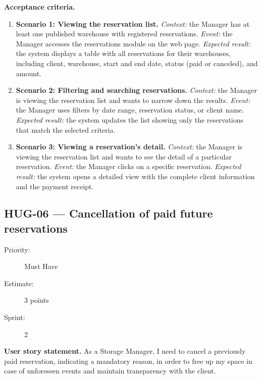 \documentclass[11pt,a4paper,oneside]{report}
\begin{document}
\textbf{Acceptance criteria.}
\begin{enumerate}
\item \textbf{Scenario 1: Viewing the reservation list.} \emph{Context:} the Manager has at least one published warehouse with registered reservations. \emph{Event:} the Manager accesses the reservations module on the web page. \emph{Expected result:} the system displays a table with all reservations for their warehouses, including client, warehouse, start and end date, status (paid or canceled), and amount.
\item \textbf{Scenario 2: Filtering and searching reservations.} \emph{Context:} the Manager is viewing the reservation list and wants to narrow down the results. \emph{Event:} the Manager uses filters by date range, reservation status, or client name. \emph{Expected result:} the system updates the list showing only the reservations that match the selected criteria.
\item \textbf{Scenario 3: Viewing a reservation's detail.} \emph{Context:} the Manager is viewing the reservation list and wants to see the detail of a particular reservation. \emph{Event:} the Manager clicks on a specific reservation. \emph{Expected result:} the system opens a detailed view with the complete client information and the payment receipt.
\end{enumerate}

\subsection{HUG-06 --- Cancellation of paid future reservations}
\label{req:HUG-06}
\begin{description}
\item[Priority:] Must Have \quad \item[Estimate:] 3 points \quad \item[Sprint:] 2
\end{description}

\textbf{User story statement.} As a Storage Manager, I need to cancel a previously paid reservation, indicating a mandatory reason, in order to free up my space in case of unforeseen events and maintain transparency with the client.
\end{document}
